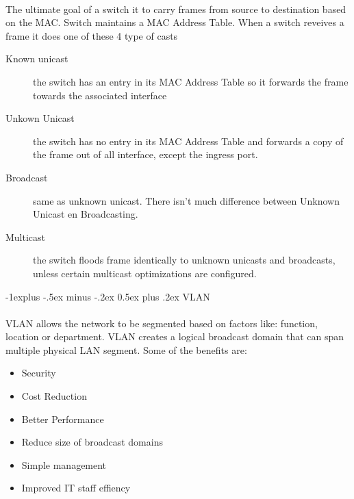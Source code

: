 \documentclass[10pt,landscape]{article}
\makeatletter
\renewcommand{\subsection}{\@startsection{subsection}{2}{0mm}%
                                {-1explus -.5ex minus -.2ex}%
                                {0.5ex plus .2ex}%
                                {\normalfont\normalsize\bfseries}}
\makeatother
\begin{document}
\begin{multicols}{3}
\paragraph{}
The ultimate goal of a switch it to carry frames from source to destination based on the MAC. Switch maintains a MAC Address Table. When a switch reveives a frame it does one of these 4 type of casts
\begin{description}
	\item[Known unicast] the switch has an entry in its MAC Address Table so it forwards the frame towards the associated interface
	\item[Unkown Unicast] the switch has no entry in its MAC Address Table and forwards a copy of the frame out of all interface, except the ingress port.
	\item[Broadcast] same as unknown unicast. There isn't much difference between Unknown Unicast en Broadcasting.
	\item[Multicast] the switch floods frame identically to unknown unicasts and broadcasts, unless certain multicast optimizations are configured.
\end{description}
\subsection{VLAN}
\paragraph{}
VLAN allows the network to be segmented based on factors like: function, location or department. VLAN creates a logical broadcast domain that can span multiple physical LAN segment.
Some of the benefits are:
\begin{itemize}
	\item Security
	\item Cost Reduction
	\item Better Performance
	\item Reduce size of broadcast domains
	\item Simple management
	\item Improved IT staff effiency
\end{itemize}

\end{multicols}
\end{document}

